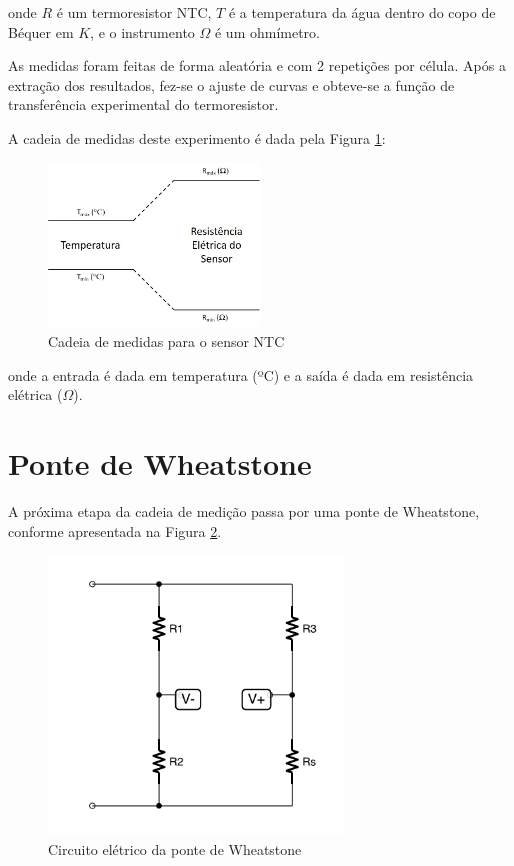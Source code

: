\documentclass[a4paper]{instrumentacao}
\begin{document}
\noindent
onde $R$ é um termoresistor NTC, $T$ é a temperatura da água dentro do copo de Béquer em $K$, e o instrumento $\Omega$ é um ohmímetro.

As medidas foram feitas de forma aleatória e com 2 repetições por célula. Após a extração dos resultados, fez-se o ajuste de curvas e obteve-se a função de transferência experimental do termoresistor.

A cadeia de medidas deste experimento é dada pela Figura \ref{fig:ntc-cadeia-medidas}:

\begin{figure}[H]
\center
\includegraphics[width=0.5\textwidth]{cadeia_medidas_pt100.jpg}
\caption{Cadeia de medidas para o sensor NTC}
\label{fig:ntc-cadeia-medidas}
\end{figure}

\noindent
onde a entrada é dada em temperatura (ºC) e a saída é dada em resistência elétrica ($\Omega$).



\section{Ponte de Wheatstone}

A próxima etapa da cadeia de medição passa por uma ponte de Wheatstone, conforme apresentada na Figura \ref{fig:wheatstone}.

\begin{figure}[H]
\center
\includegraphics[width=0.7\textwidth]{Wheatstone.pdf}
\caption{Circuito elétrico da ponte de Wheatstone}
\label{fig:wheatstone}
\end{figure}
\end{document}
